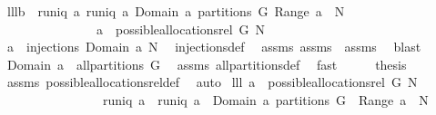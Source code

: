\begin{isabellebody}
%
\endisatagproof
{\isafoldproof}%
%
\isadelimproof
\isanewline
%
\endisadelimproof
\isanewline
\isanewline
{}\isamarkupfalse%
\ lll{}{}b{\isacharcolon}\ \ {\isachardoublequoteopen}runiq\ a{\isachardoublequoteclose}\ {\isachardoublequoteopen}runiq\ {\isacharparenleft}a{\isasyminverse}{\isacharparenright}{\isachardoublequoteclose}\ {\isachardoublequoteopen}{\isacharparenleft}Domain\ a{\isacharparenright}\ partitions\ G{\isachardoublequoteclose}\ {\isachardoublequoteopen}Range\ a\ {\isasymsubseteq}\ N{\isachardoublequoteclose}\isanewline
\ \ \ \ \ \ \ \ \ \ \ \ \ \ \ {\isachardoublequoteopen}a\ {\isasymin}\ possible{\isacharunderscore}allocations{\isacharunderscore}rel\ G\ N{\isachardoublequoteclose}\isanewline
%
\isadelimproof
%
\endisadelimproof
%
\isatagproof
{}\isamarkupfalse%
\ {\isacharminus}\isanewline
\ \ \isamarkupfalse%
\ {\isachardoublequoteopen}a\ {\isasymin}\ injections\ {\isacharparenleft}Domain\ a{\isacharparenright}\ N{\isachardoublequoteclose}\ \isamarkupfalse%
\ injections{\isacharunderscore}def\ \isamarkupfalse%
\ assms{\isacharparenleft}{}{\isacharparenright}\ assms{\isacharparenleft}{}{\isacharparenright}\ \ assms{\isacharparenleft}{}{\isacharparenright}\ \isamarkupfalse%
\ blast\isanewline
\ \ \isamarkupfalse%
\ \isamarkupfalse%
\ {\isachardoublequoteopen}Domain\ a\ {\isasymin}\ all{\isacharunderscore}partitions\ G{\isachardoublequoteclose}\ \isamarkupfalse%
\ assms{\isacharparenleft}{}{\isacharparenright}\ all{\isacharunderscore}partitions{\isacharunderscore}def\ \isamarkupfalse%
\ fast\isanewline
\ \ \isamarkupfalse%
\ \isamarkupfalse%
\ {\isacharquery}thesis\ \isamarkupfalse%
\ assms{\isacharparenleft}{}{\isacharparenright}\ possible{\isacharunderscore}allocations{\isacharunderscore}rel{\isacharunderscore}def\ \isamarkupfalse%
\ auto\isanewline
{}\isamarkupfalse%
%
\endisatagproof
{\isafoldproof}%
%
\isadelimproof
\isanewline
%
\endisadelimproof
\isanewline
\isanewline
{}\isamarkupfalse%
\ lll{}{}{\isacharcolon}\ {\isachardoublequoteopen}a\ {\isasymin}\ possible{\isacharunderscore}allocations{\isacharunderscore}rel\ G\ N\ {\isasymlongleftrightarrow}\isanewline
\ \ \ \ \ \ \ \ \ \ \ \ \ \ \ \ runiq\ a\ {\isacharampersand}\ runiq\ {\isacharparenleft}a{\isasyminverse}{\isacharparenright}\ {\isacharampersand}\ {\isacharparenleft}Domain\ a{\isacharparenright}\ partitions\ G\ {\isacharampersand}\ Range\ a\ {\isasymsubseteq}\ N{\isachardoublequoteclose}\isanewline

\end{isabellebody}

